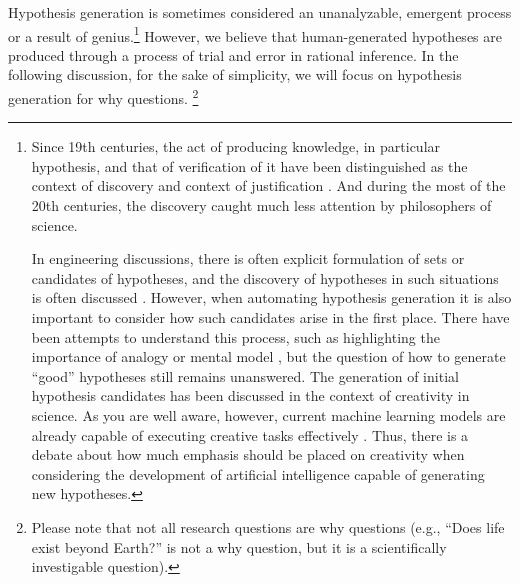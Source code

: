Hypothesis generation is sometimes considered an unanalyzable, emergent process or a result of genius.\footnote{
Since 19th centuries, the act of producing knowledge, in particular hypothesis, and that of verification of it have been distinguished as the context of discovery and context of justification \cite{sep-scientific-discovery}. And during the most of the 20th centuries, the discovery caught much less attention by philosophers of science.

In engineering discussions, there is often explicit formulation of sets or candidates of hypotheses, and the discovery of hypotheses in such situations is often discussed \cite{simon1973does,kitano2021nobel,bengio2022ml4sci}. However, when automating hypothesis generation it is also important to consider how such candidates arise in the first place. There have been attempts to understand this process, such as highlighting the importance of analogy \cite{thagard1984conceptual} or mental model \cite{nersessian1999model}, but the question of how to generate ``good'' hypotheses still remains unanswered. The generation of initial hypothesis candidates has been discussed in the context of creativity in science. As you are well aware, however, current machine learning models are already capable of executing creative tasks effectively \cite{sep-creativity}. Thus, there is a debate about how much emphasis should be placed on creativity when considering the development of artificial intelligence capable of generating new hypotheses.
} However, we believe that human-generated hypotheses are produced through a process of trial and error in rational inference. In the following discussion, for the sake of simplicity, we will focus on hypothesis generation for why questions. \footnote{
Please note that not all research questions are why questions (e.g., ``Does life exist beyond Earth?'' is not a why question, but it is a scientifically investigable question).
}




